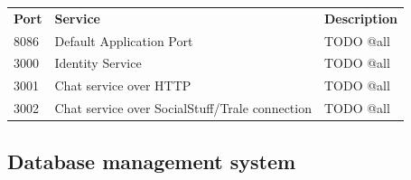 \begin{table}[]
    \begin{tabular}{lll}
        \textbf{Port} & \textbf{Service}                               & \textbf{Description} \\
        8086          & Default Application Port                       & TODO @all            \\
        3000          & Identity Service                               & TODO @all            \\
        3001          & Chat service over HTTP                         & TODO @all            \\
        3002          & Chat service over SocialStuff/Trale connection & TODO @all
    \end{tabular}\label{tab:table}
\end{table}

\subsection{Database management system}\label{subsec:database-management-system}

\lipsum[2-4]
